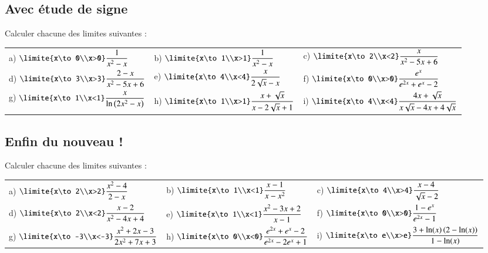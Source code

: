 \documentclass[oneside,12pt]{article}          %
\begin{document}
\subsection{Avec étude de signe}
Calculer chacune des limites suivantes :

\renewcommand{\arraystretch}{2}
\begin{tabular}{p{} p{} p{}}
	a) $\limite{x\to0\\x>0} \dfrac{1}{x^2-x}$  &
	b) $\limite{x\to1\\x>1} \dfrac{1}{x^2-x}$ &
	c) $\limite{x\to2\\x<2} \dfrac{x}{x^2-5x+6}$ \\
	d) $\limite{x\to3\\x>3} \dfrac{2-x}{x^2-5x+6}$ &
	e) $\limite{x\to4\\x<4} \dfrac{x}{2\sqrt{x}-x}$ &
	f) $\limite{x\to0\\x>0} \dfrac{e^x}{e^{2x}+e^x-2}$ \\
	g) $\limite{x\to1\\x<1} \dfrac{x}{\ln\left(2x^2-x\right)}$ &
	h) $\limite{x\to1\\x>1} \dfrac{x+\sqrt{x}}{x-2\sqrt{x}+1}$ &
	i) $\limite{x\to4\\x<4} \dfrac{4x+\sqrt{x}}{x\sqrt{x}-4x+4\sqrt{x}}$ \\
\end{tabular}



\subsection{Enfin du nouveau !}
Calculer chacune des limites suivantes :

\renewcommand{\arraystretch}{2}
\begin{tabular}{p{} p{} p{}}
	a) $\limite{x\to2\\x>2} \dfrac{x^2-4}{2-x}$  &
	b) $\limite{x\to1\\x<1} \dfrac{x-1}{x-x^2}$ &
	c) $\limite{x\to4\\x>4} \dfrac{x-4}{\sqrt{x}-2}$ \\
	d) $\limite{x\to2\\x<2} \dfrac{x-2}{x^2-4x+4}$ &
	e) $\limite{x\to1\\x<1} \dfrac{x^2-3x+2}{x-1}$ &
	f) $\limite{x\to0\\x>0} \dfrac{1-e^x}{e^{2x}-1}$ \\
	g) $\limite{x\to-3\\x<-3} \dfrac{x^2+2x-3}{2x^2+7x+3}$ &
	h) $\limite{x\to0\\x<0} \dfrac{e^{2x}+e^x-2}{e^{2x}-2e^x+1}$ &
	i) $\limite{x\to e\\x>e} \dfrac{3+\ln(x)\left(2-\ln(x)\right)}{1-\ln(x)}$ \\
\end{tabular}
\end{document}
